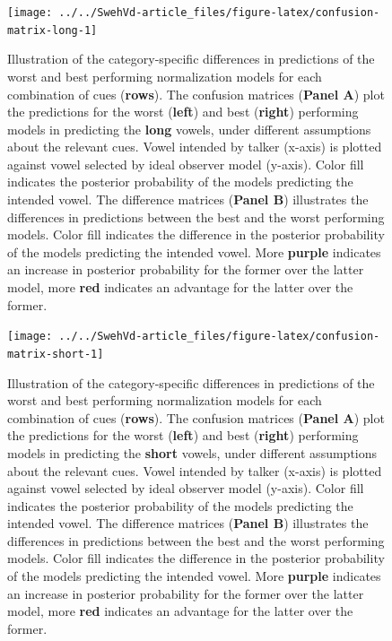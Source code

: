 \documentclass[utf8]{frontiers_suppmat} %
\begin{document}
\begin{landscape}

\begin{figure}

{\centering \texttt{[image: ../../SwehVd-article\_files/figure-latex/confusion-matrix-long-1]} 

}

\caption{Illustration of the category-specific differences in predictions of the worst and best performing normalization models for each combination of cues (\textbf{rows}). The confusion matrices (\textbf{Panel A}) plot the predictions for the worst (\textbf{left}) and best (\textbf{right}) performing models in predicting the \textbf{long} vowels, under different assumptions about the relevant cues. Vowel intended by talker (x-axis) is plotted against vowel selected by ideal observer model (y-axis). Color fill indicates the posterior probability of the models predicting the intended vowel. The difference matrices (\textbf{Panel B}) illustrates the differences in predictions between the best and the worst performing models. Color fill indicates the difference in the posterior probability of the models predicting the intended vowel. More \textbf{purple} indicates an increase in posterior probability for the former over the latter model, more \textbf{red} indicates an advantage for the latter over the former.}\label{fig:confusion-matrix-long}
\end{figure}
\end{landscape}



\begin{landscape}

\begin{figure}

{\centering \texttt{[image: ../../SwehVd-article\_files/figure-latex/confusion-matrix-short-1]} 

}

\caption{Illustration of the category-specific differences in predictions of the worst and best performing normalization models for each combination of cues (\textbf{rows}). The confusion matrices (\textbf{Panel A}) plot the predictions for the worst (\textbf{left}) and best (\textbf{right}) performing models in predicting the \textbf{short} vowels, under different assumptions about the relevant cues. Vowel intended by talker (x-axis) is plotted against vowel selected by ideal observer model (y-axis). Color fill indicates the posterior probability of the models predicting the intended vowel. The difference matrices (\textbf{Panel B}) illustrates the differences in predictions between the best and the worst performing models. Color fill indicates the difference in the posterior probability of the models predicting the intended vowel. More \textbf{purple} indicates an increase in posterior probability for the former over the latter model, more \textbf{red} indicates an advantage for the latter over the former.}\label{fig:confusion-matrix-short}
\end{figure}

\end{landscape}
\end{document}
